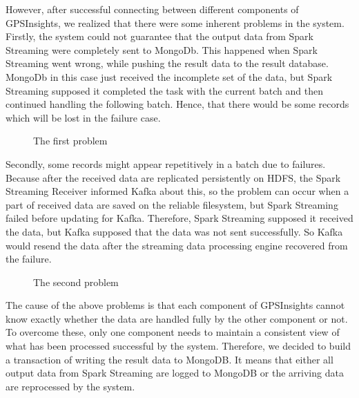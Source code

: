 \documentclass{acm_proc_article-sp}
\begin{document}
However, after successful connecting between different components of GPSInsights, we realized that there were some inherent problems in the system. Firstly, the system could not guarantee that the output data from Spark Streaming were completely sent to MongoDb. This happened when Spark Streaming went wrong, while pushing the result data to the result database. MongoDb in this case just received the incomplete set of the data, but Spark Streaming supposed it completed the task with the current batch and then continued handling the following batch. Hence, that there would be some records which will be lost in the failure case.

\begin{figure}[!htb]
\centering
{}
\caption{The first problem}
\end{figure} 

Secondly, some records might appear repetitively in a batch due to failures. Because after the received data are replicated persistently on HDFS, the Spark Streaming Receiver informed Kafka about this, so the problem can occur when a part of received data are saved on the reliable filesystem, but Spark Streaming failed before updating for Kafka. Therefore, Spark Streaming supposed it received the data, but Kafka supposed that the data was not sent successfully. So Kafka would resend the data after the streaming data processing engine recovered from the failure.

 
\begin{figure}[!htb]
\centering
{}
\caption{The second problem}
\end{figure} 

The cause of the above problems is that each component of GPSInsights cannot know exactly whether the data are handled fully by the other component or not. To overcome these, only one component needs to maintain a consistent view of what has been processed successful by the system. Therefore, we decided to build a transaction of writing the result data to MongoDB. It means that either all output data from Spark Streaming are logged to MongoDB or the arriving data are reprocessed by the system. 
\end{document}
